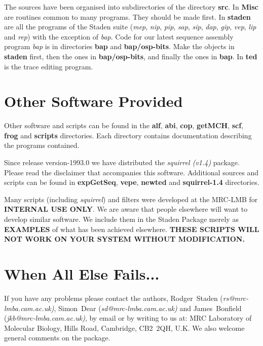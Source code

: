 The sources have been organised into subdirectories of the directory
{\bf src}. In {\bf Misc} are routines common to many programs. They
should be made first.  In {\bf staden} are all the programs of the
Staden suite ({\em mep}, {\em nip}, {\em pip}, {\em sap}, {\em sip},
{\em dap}, {\em gip}, {\em vep}, {\em lip} and {\em rep}) with the
exception of {\em bap}.  Code for our latest sequence assembly program
{\em bap} is in directories {\bf bap} and {\bf bap/osp-bits}.  Make
the objects in {\bf staden} first, then the ones in {\bf
bap/osp-bits}, and finally the ones in {\bf bap}. In {\bf ted} is the
trace editing program.


\section {Other Software Provided}

Other software and scripts can be found in the {\bf alf\/}, {\bf
abi\/}, {\bf cop\/}, {\bf getMCH\/}, {\bf scf\/}, {\bf frog\/} and {\bf
scripts}
directories.
Each directory contains documentation describing the programs
contained.

Since release version-1993.0 we have distributed the {\em squirrel (v1.4)}
package. Please read the disclaimer that accompanies this software.
Additional sources and scripts can be found in {\bf expGetSeq}, {\bf vepe},
{\bf newted} and {\bf squirrel-1.4} directories.

Many scripts (including {\em squirrel}) and filters were developed at the MRC-LMB for
{\bf INTERNAL USE ONLY}.
We are aware that people elsewhere will want to develop
similar software.
We include them in the Staden Package merely as {\bf EXAMPLES} of
what has been achieved elsewhere.
{\bf THESE SCRIPTS WILL NOT WORK ON YOUR SYSTEM WITHOUT MODIFICATION.}

\section {When All Else Fails...}
If you have any problems please contact the authors,
\mbox{Rodger Staden}
\mbox{(\em rs@mrc-lmba.cam.ac.uk\/)},
\mbox{Simon Dear}
\mbox{(\em sd@mrc-lmba.cam.ac.uk\/)}
and
\mbox{James Bonfield}
\mbox{(\em jkb@mrc-lmba.cam.ac.uk\/)},
by email or by writing to us at:
MRC Laboratory of Molecular Biology, Hills Road, Cambridge, \mbox{CB2 2QH}, U.K.
We also welcome general comments on the package.


